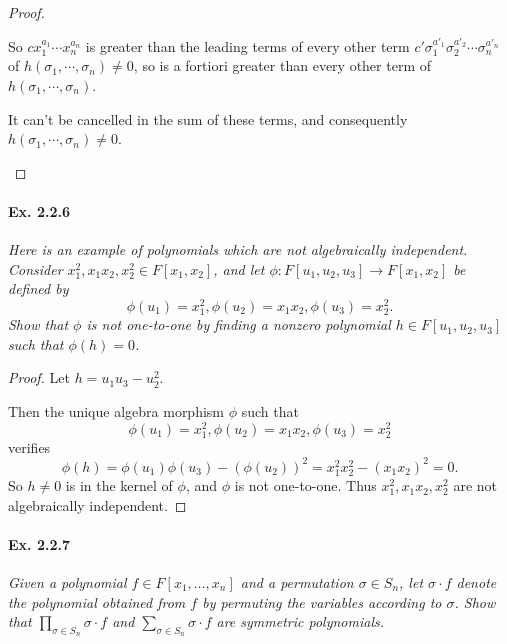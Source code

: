 \documentclass[11pt,a4paper]{article}
\begin{document}
\begin{proof}
\begin{enumerate}
So $cx_1^{a_1}\cdots x_n^{a_n}$ is greater than the leading terms of every other term $c'\sigma_1^{a'_1}\sigma_2^{a'_2}\cdots \sigma_n^{a'_n}$ of $h(\sigma_1,\cdots,\sigma_n) \neq 0$, so is a fortiori greater than every other term of $h(\sigma_1,\cdots,\sigma_n)$.

 It can't be cancelled in the sum of these terms, and consequently $h(\sigma_1,\cdots,\sigma_n) \neq 0$.
\end{enumerate}
\end{proof}

\paragraph{Ex. 2.2.6}

{\it Here is an example of polynomials which are not algebraically independent. Consider $x_1^2,x_1x_2,x_2^2 \in F[x_1,x_2]$, and let $\phi : F[u_1,u_2,u_3] \to F[x_1,x_2]$ be defined by
$$\phi(u_1) = x_1^2,\phi(u_2)= x_1x_2, \phi(u_3) = x_2^2.$$
Show that $\phi$ is not one-to-one by finding a nonzero polynomial $h \in F[u_1,u_2,u_3]$ such that $\phi(h)=0$.
}

\begin{proof}
Let $h = u_1u_3 -u_2^2$.

Then the unique algebra morphism $\phi$ such that 
$$\phi(u_1) = x_1^2, \phi(u_2) = x_1x_2, \phi(u_3) = x_2^2$$
verifies
$$\phi(h) = \phi(u_1)\phi(u_3) - (\phi(u_2))^2 = x_1^2 x_2^2 - (x_1x_2)^2 = 0.$$
So $h \neq 0$ is in the kernel of $\phi$, and $\phi$ is not one-to-one. Thus $x_1^2,x_1x_2,x_2^2$ are not algebraically independent.
\end{proof}

\paragraph{Ex. 2.2.7}

{\it Given a polynomial $f \in F[x_1,\ldots,x_n]$ and a permutation $\sigma \in S_n$, let $\sigma \cdot f$ denote the polynomial obtained from $f$ by permuting the variables according to $\sigma$. Show that $\prod_{\sigma \in S_n} \sigma \cdot f$ and $\sum_{\sigma \in S_n} \sigma \cdot f$ are symmetric polynomials.
}
\end{document}
